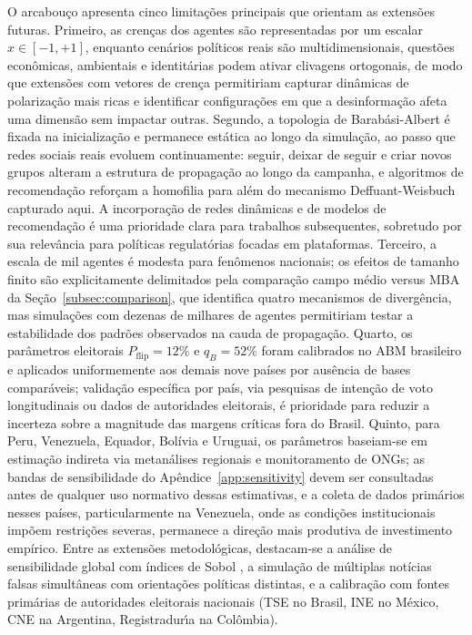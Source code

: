 \documentclass[12pt,a4paper]{article}
\theoremstyle{definition}
\theoremstyle{plain}
\begin{document}
O arcabouço apresenta cinco limitações principais que orientam as extensões futuras. Primeiro, as crenças dos agentes são representadas por um escalar $x \in [-1,+1]$, enquanto cenários políticos reais são multidimensionais, questões econômicas, ambientais e identitárias podem ativar clivagens ortogonais, de modo que extensões com vetores de crença permitiriam capturar dinâmicas de polarização mais ricas e identificar configurações em que a desinformação afeta uma dimensão sem impactar outras. Segundo, a topologia de Barabási-Albert é fixada na inicialização e permanece estática ao longo da simulação, ao passo que redes sociais reais evoluem continuamente: seguir, deixar de seguir e criar novos grupos alteram a estrutura de propagação ao longo da campanha, e algoritmos de recomendação reforçam a homofilia para além do mecanismo Deffuant-Weisbuch capturado aqui. A incorporação de redes dinâmicas e de modelos de recomendação é uma prioridade clara para trabalhos subsequentes, sobretudo por sua relevância para políticas regulatórias focadas em plataformas. Terceiro, a escala de mil agentes é modesta para fenômenos nacionais; os efeitos de tamanho finito são explicitamente delimitados pela comparação campo médio versus MBA da Seção~\ref{subsec:comparison}, que identifica quatro mecanismos de divergência, mas simulações com dezenas de milhares de agentes permitiriam testar a estabilidade dos padrões observados na cauda de propagação. Quarto, os parâmetros eleitorais $P_{\text{flip}} = 12\%$ e $q_B = 52\%$ foram calibrados no ABM brasileiro e aplicados uniformemente aos demais nove países por ausência de bases comparáveis; validação específica por país, via pesquisas de intenção de voto longitudinais ou dados de autoridades eleitorais, é prioridade para reduzir a incerteza sobre a magnitude das margens críticas fora do Brasil. Quinto, para Peru, Venezuela, Equador, Bolívia e Uruguai, os parâmetros baseiam-se em estimação indireta via metanálises regionais e monitoramento de ONGs; as bandas de sensibilidade do Apêndice~\ref{app:sensitivity} devem ser consultadas antes de qualquer uso normativo dessas estimativas, e a coleta de dados primários nesses países, particularmente na Venezuela, onde as condições institucionais impõem restrições severas, permanece a direção mais produtiva de investimento empírico. Entre as extensões metodológicas, destacam-se a análise de sensibilidade global com índices de Sobol \citep{saltelli2008global}, a simulação de múltiplas notícias falsas simultâneas com orientações políticas distintas, e a calibração com fontes primárias de autoridades eleitorais nacionais (TSE no Brasil, INE no México, CNE na Argentina, Registradur\'{\i}a na Colômbia).
\end{document}
